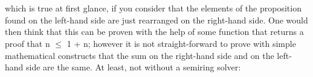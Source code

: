 {\begin{code}%
\>[0]\AgdaSpace{}%
\AgdaSymbol{:}\AgdaSpace{}%
\AgdaSpace{}%
\AgdaSpace{}%
\AgdaSpace{}%
\AgdaSpace{}%
\AgdaSpace{}%
\<%
\\
\>[0][@{}l@{\AgdaIndent{0}}]%
\>[2]\AgdaSpace{}%
\AgdaSpace{}%
\AgdaOperator{\AgdaPrimitive{+}}\AgdaSpace{}%
\AgdaSpace{}%
\AgdaSymbol{((}\AgdaSpace{}%
\AgdaOperator{\AgdaInductiveConstructor{,}}\AgdaSpace{}%
\AgdaSymbol{)}\AgdaSpace{}%
\AgdaSpace{}%
\AgdaSymbol{)}\AgdaSpace{}%
\<%
\\
%
\>[2]\AgdaSpace{}%
\AgdaSymbol{(}\AgdaSpace{}%
\AgdaSymbol{((}\AgdaSpace{}%
\AgdaOperator{\AgdaInductiveConstructor{,}}\AgdaSpace{}%
\AgdaSymbol{)}\AgdaSpace{}%
\AgdaSpace{}%
\AgdaSymbol{)}\AgdaSpace{}%
\AgdaOperator{\AgdaPrimitive{+}}\AgdaSpace{}%
\AgdaSpace{}%
\AgdaSymbol{)}\<%
\end{code}

which is true at first glance, if you consider that the elements of the proposition found on the left-hand side are just rearranged on the right-hand side. One would then think that this can be proven with the help of some function that returns a proof that n $\le$ 1 + n; however it is not straight-forward to prove with simple mathematical constructs that the sum on the right-hand side and on the left-hand side are the same. At least, not without a semiring solver: 

}
